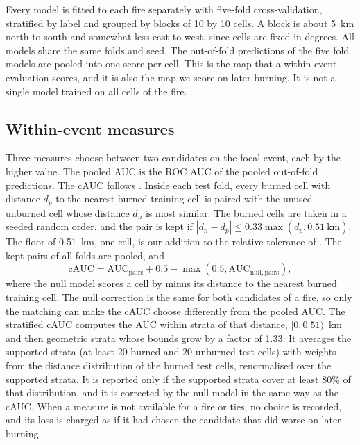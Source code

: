 \documentclass[preprint,12pt,authoryear]{elsarticle}
\begin{document}
Every model is fitted to each fire separately with five-fold cross-validation, stratified by label and grouped by blocks of 10 by 10 cells. A block is about 5~km north to south and somewhat less east to west, since cells are fixed in degrees. All models share the same folds and seed. The out-of-fold predictions of the five fold models are pooled into one score per cell. This is the map that a within-event evaluation scores, and it is also the map we score on later burning. It is not a single model trained on all cells of the fire.

\subsection{Within-event measures}
\label{sec:measures}

Three measures choose between two candidates on the focal event, each by the higher value. The pooled AUC is the ROC AUC of the pooled out-of-fold predictions. The cAUC follows \citet{Hijmans2012}. Inside each test fold, every burned cell with distance $d_p$ to the nearest burned training cell is paired with the unused unburned cell whose distance $d_n$ is most similar. The burned cells are taken in a seeded random order, and the pair is kept if $|d_n - d_p| \le 0.33 \max(d_p, 0.51\ \mathrm{km})$. The floor of 0.51~km, one cell, is our addition to the relative tolerance of \citet{Hijmans2012}. The kept pairs of all folds are pooled, and
\begin{equation}
\mathrm{cAUC} = \mathrm{AUC}_\mathrm{pairs} + 0.5 - \max(0.5, \mathrm{AUC}_\mathrm{null,pairs}),
\end{equation}
where the null model scores a cell by minus its distance to the nearest burned training cell. The null correction is the same for both candidates of a fire, so only the matching can make the cAUC choose differently from the pooled AUC. The stratified cAUC computes the AUC within strata of that distance, $[0, 0.51)$~km and then geometric strata whose bounds grow by a factor of 1.33. It averages the supported strata (at least 20 burned and 20 unburned test cells) with weights from the distance distribution of the burned test cells, renormalised over the supported strata. It is reported only if the supported strata cover at least 80\% of that distribution, and it is corrected by the null model in the same way as the cAUC. When a measure is not available for a fire or ties, no choice is recorded, and its loss is charged as if it had chosen the candidate that did worse on later burning.
\end{document}
